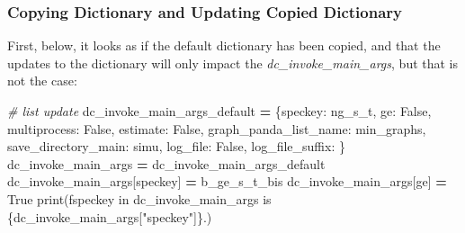 \documentclass[
]{book}
\newenvironment{Shaded}{\begin{snugshade}}{\end{snugshade}}
\newcommand{\BuiltInTok}[1]{#1}
\newcommand{\CommentTok}[1]{\textcolor[rgb]{0.56,0.35,0.01}{\textit{#1}}}
\newcommand{\NormalTok}[1]{#1}
\newcommand{\OperatorTok}[1]{\textcolor[rgb]{0.81,0.36,0.00}{\textbf{#1}}}
\newcommand{\SpecialCharTok}[1]{\textcolor[rgb]{0.00,0.00,0.00}{#1}}
\newcommand{\SpecialStringTok}[1]{\textcolor[rgb]{0.31,0.60,0.02}{#1}}
\newcommand{\StringTok}[1]{\textcolor[rgb]{0.31,0.60,0.02}{#1}}
\newcommand{\VariableTok}[1]{\textcolor[rgb]{0.00,0.00,0.00}{#1}}
\begin{document}
\hypertarget{copying-dictionary-and-updating-copied-dictionary}{%
\subsubsection{Copying Dictionary and Updating Copied Dictionary}\label{copying-dictionary-and-updating-copied-dictionary}}

First, below, it looks as if the default dictionary has been copied, and that the updates to the dictionary will only impact the \emph{dc\_invoke\_main\_args}, but that is not the case:

\begin{Shaded}
\begin{Highlighting}[]
\CommentTok{\# list update}
\NormalTok{dc\_invoke\_main\_args\_default }\OperatorTok{=}\NormalTok{ \{}\StringTok{\textquotesingle{}speckey\textquotesingle{}}\NormalTok{: }\StringTok{\textquotesingle{}ng\_s\_t\textquotesingle{}}\NormalTok{,}
                               \StringTok{\textquotesingle{}ge\textquotesingle{}}\NormalTok{: }\VariableTok{False}\NormalTok{,}
                               \StringTok{\textquotesingle{}multiprocess\textquotesingle{}}\NormalTok{: }\VariableTok{False}\NormalTok{,}
                               \StringTok{\textquotesingle{}estimate\textquotesingle{}}\NormalTok{: }\VariableTok{False}\NormalTok{,}
                               \StringTok{\textquotesingle{}graph\_panda\_list\_name\textquotesingle{}}\NormalTok{: }\StringTok{\textquotesingle{}min\_graphs\textquotesingle{}}\NormalTok{,}
                               \StringTok{\textquotesingle{}save\_directory\_main\textquotesingle{}}\NormalTok{: }\StringTok{\textquotesingle{}simu\textquotesingle{}}\NormalTok{,}
                               \StringTok{\textquotesingle{}log\_file\textquotesingle{}}\NormalTok{: }\VariableTok{False}\NormalTok{,}
                               \StringTok{\textquotesingle{}log\_file\_suffix\textquotesingle{}}\NormalTok{: }\StringTok{\textquotesingle{}\textquotesingle{}}\NormalTok{\}}
\NormalTok{dc\_invoke\_main\_args }\OperatorTok{=}\NormalTok{ dc\_invoke\_main\_args\_default}
\NormalTok{dc\_invoke\_main\_args[}\StringTok{\textquotesingle{}speckey\textquotesingle{}}\NormalTok{] }\OperatorTok{=} \StringTok{\textquotesingle{}b\_ge\_s\_t\_bis\textquotesingle{}}
\NormalTok{dc\_invoke\_main\_args[}\StringTok{\textquotesingle{}ge\textquotesingle{}}\NormalTok{] }\OperatorTok{=} \VariableTok{True}
\BuiltInTok{print}\NormalTok{(}\SpecialStringTok{f\textquotesingle{}speckey in dc\_invoke\_main\_args is }\SpecialCharTok{\{}\NormalTok{dc\_invoke\_main\_args[}\StringTok{"speckey"}\NormalTok{]}\SpecialCharTok{\}}\SpecialStringTok{.\textquotesingle{}}\NormalTok{)}
\end{Highlighting}
\end{Shaded}
\end{document}
